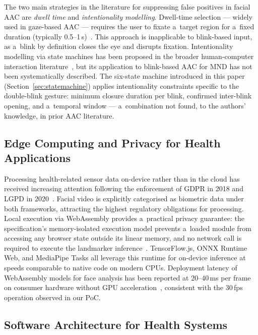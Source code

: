 The two main strategies in the literature for suppressing false positives in facial AAC
are \emph{dwell time} and \emph{intentionality modelling}. Dwell-time selection — widely
used in gaze-based AAC — requires the user to fixate a~target region for a~fixed
duration (typically 0.5--1\,s)~\cite{majaranta2002eyetyping}. This approach is
inapplicable to blink-based input, as a~blink by definition closes the eye and disrupts
fixation. Intentionality modelling via state machines has been proposed in the broader
human-computer interaction literature~\cite{zander2011passive}, but its application to
blink-based AAC for MND has not been systematically described. The six-state machine
introduced in this paper (Section~\ref{sec:statemachine}) applies intentionality
constraints specific to the double-blink gesture: minimum closure duration per blink,
confirmed inter-blink opening, and a~temporal window — a~combination not found, to the
authors' knowledge, in prior AAC literature.

\subsection{Edge Computing and Privacy for Health Applications}

Processing health-related sensor data on-device rather than in the cloud has received
increasing attention following the enforcement of GDPR in 2018 and LGPD in
2020~\cite{edpb2020privacy}. Facial video is explicitly categorised as biometric data
under both frameworks, attracting the highest regulatory obligations for processing.
Local execution via WebAssembly provides a~practical privacy guarantee: the
specification's memory-isolated execution model prevents a~loaded module from accessing
any browser state outside its linear memory, and no network call is required to execute
the landmarker inference~\cite{haas2017wasm}. TensorFlow.js, ONNX Runtime Web, and
MediaPipe Tasks all leverage this runtime for on-device inference at speeds comparable
to native code on modern CPUs. Deployment latency of WebAssembly models for face
analysis has been reported at 20--40\,ms per frame on consumer hardware without GPU
acceleration~\cite{lugaresi2019mediapipe}, consistent with the 30\,fps operation
observed in our PoC.

\subsection{Software Architecture for Health Systems}


